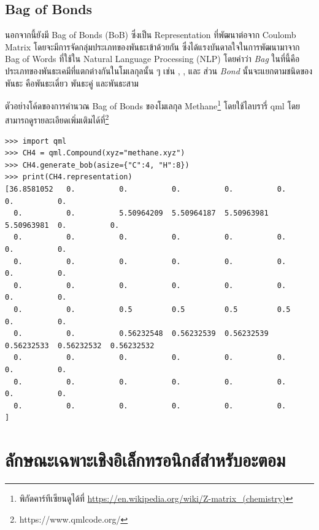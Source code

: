 \subsection{Bag of Bonds}
\label{ssec:bob}

นอกจากนี้ยังมี Bag of Bonds (BoB)\autocite{hansen2015} ซึ่งเป็น Representation ที่พัฒนาต่อจาก Coulomb Matrix 
โดยจะมีการจัดกลุ่มประเภทของพันธะเข้าด้วยกัน ซึ่งได้แรงบันดาลใจในการพัฒนามาจาก Bag of Words ที่ใช้ใน Natural Language Processing
(NLP) โดยคำว่า \textit{Bag} ในที่นี้คือประเภทของพันธะเคมีที่แตกต่างกันในโมเลกุลนั้น ๆ เช่น , , และ  
ส่วน \textit{Bond} นั้นจะแยกตามชนิดของพันธะ คือพันธะเดี่ยว พันธะคู่ และพันธะสาม

ตัวอย่างโค้ดของการคำนวณ Bag of Bonds ของโมเลกุล Methane\footnote{พิกัดคาร์ทีเซียนดูได้ที่ 
\url{https://en.wikipedia.org/wiki/Z-matrix_(chemistry)}} โดยใช้ไลบรารี่ qml\autocite{zotero-1799} 
โดยสามารถดูรายละเอียดเพิ่มเติมได้ที่\footnote{https://www.qmlcode.org/}

\begin{lstlisting}[style=MyPython]
>>> import qml
>>> CH4 = qml.Compound(xyz="methane.xyz")
>>> CH4.generate_bob(asize={"C":4, "H":8})
>>> print(CH4.representation)
[36.8581052   0.          0.          0.          0.          0.          0.          0.
  0.          0.          5.50964209  5.50964187  5.50963981  5.50963981  0.          0.
  0.          0.          0.          0.          0.          0.          0.          0.
  0.          0.          0.          0.          0.          0.          0.          0.
  0.          0.          0.          0.          0.          0.          0.          0.
  0.          0.          0.5         0.5         0.5         0.5         0.          0.
  0.          0.          0.56232548  0.56232539  0.56232539  0.56232533  0.56232532  0.56232532
  0.          0.          0.          0.          0.          0.          0.          0.
  0.          0.          0.          0.          0.          0.          0.          0.
  0.          0.          0.          0.          0.          0.        ]
\end{lstlisting}

\section{ลักษณะเฉพาะเชิงอิเล็กทรอนิกส์สำหรับอะตอม}
\label{sec:elec_feat}

